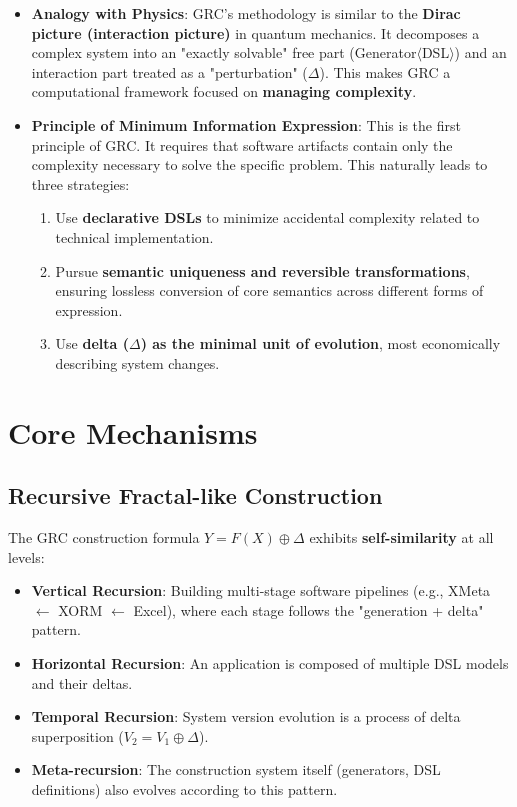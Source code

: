 \documentclass[11pt]{article}
\begin{document}
\begin{itemize}
    \item \textbf{Analogy with Physics}: GRC's methodology is similar to the \textbf{Dirac picture (interaction picture)} in quantum mechanics. It decomposes a complex system into an "exactly solvable" free part (Generator$\langle$DSL$\rangle$) and an interaction part treated as a "perturbation" ($\Delta$). This makes GRC a computational framework focused on \textbf{managing complexity}.
    \item \textbf{Principle of Minimum Information Expression}: This is the first principle of GRC. It requires that software artifacts contain only the complexity necessary to solve the specific problem. This naturally leads to three strategies:
    \begin{enumerate}
        \item Use \textbf{declarative DSLs} to minimize accidental complexity related to technical implementation.
        \item Pursue \textbf{semantic uniqueness and reversible transformations}, ensuring lossless conversion of core semantics across different forms of expression.
        \item Use \textbf{delta ($\Delta$) as the minimal unit of evolution}, most economically describing system changes.
    \end{enumerate}
\end{itemize}

\section{Core Mechanisms}

\subsection{Recursive Fractal-like Construction}
The GRC construction formula \( Y = F(X) \oplus \Delta \) exhibits \textbf{self-similarity} at all levels:
\begin{itemize}
    \item \textbf{Vertical Recursion}: Building multi-stage software pipelines (e.g., XMeta $\leftarrow$ XORM $\leftarrow$ Excel), where each stage follows the "generation + delta" pattern.
    \item \textbf{Horizontal Recursion}: An application is composed of multiple DSL models and their deltas.
    \item \textbf{Temporal Recursion}: System version evolution is a process of delta superposition (\( V_2 = V_1 \oplus \Delta \)).
    \item \textbf{Meta-recursion}: The construction system itself (generators, DSL definitions) also evolves according to this pattern.
\end{itemize}
\end{document}
